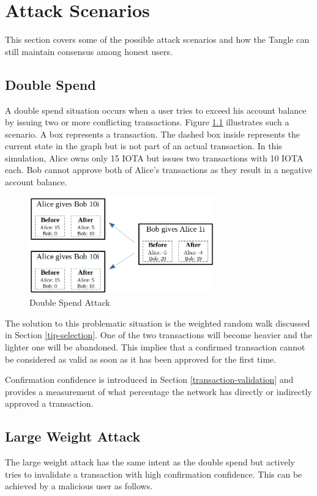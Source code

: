 \chapter{Attack Scenarios}\label{attacks}

This section covers some of the possible attack scenarios and how the Tangle can still maintain consensus among honest users.

\section{Double Spend}
A double spend situation occurs when a user tries to exceed his account balance by issuing two or more conflicting transactions. Figure \ref{fig:double-spend} illustrates such a scenario. A box represents a transaction. The dashed box inside represents the current state in the graph but is not part of an actual transaction. In this simulation, Alice owns only 15 IOTA but issues two transactions with 10 IOTA each. Bob cannot approve both of Alice's transactions as they result in a negative account balance.

\begin{figure}[H]
    \centering
    \includegraphics[width=8cm]{images/double-spend.png}
    \caption{Double Spend Attack \cite{the-tangle-part-5}}
    \label{fig:double-spend}
\end{figure}

The solution to this problematic situation is the weighted random walk discussed in Section \ref{tip-selection}. One of the two transactions will become heavier and the lighter one will be abandoned. This implies that a confirmed transaction cannot be considered as valid as soon as it has been approved for the first time. 

Confirmation confidence is introduced in Section \ref{transaction-validation} and provides a measurement of what percentage the network has directly or indirectly approved a transaction. 


\section{Large Weight Attack}
The large weight attack has the same intent as the double spend but actively tries to invalidate a transaction with high confirmation confidence. This can be achieved by a malicious user as follows.

